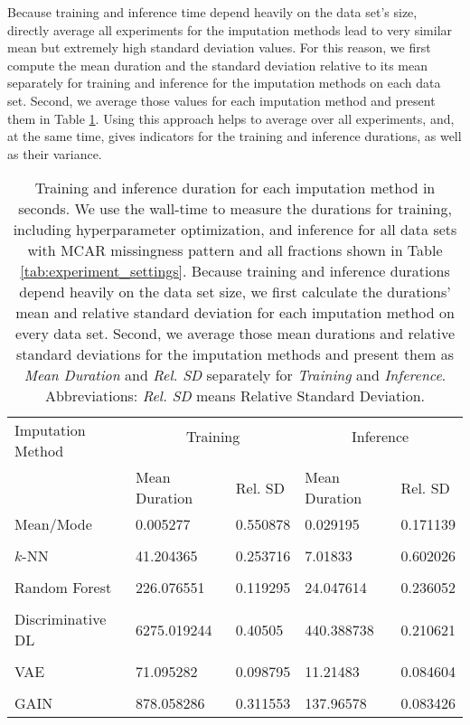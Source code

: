 Because training and inference time depend heavily on the data set's size, directly average all experiments for the imputation methods lead to very similar mean but extremely high standard deviation values. For this reason, we first compute the mean duration and the standard deviation relative to its mean separately for training and inference for the imputation methods on each data set. Second, we average those values for each imputation method and present them in Table \ref{tab:time}. Using this approach helps to average over all experiments, and, at the same time, gives indicators for the training and inference durations, as well as their variance.
%
\begin{table}
	\centering
	\begin{tabular}{@{\extracolsep{4pt}}lllll@{}}
		\toprule
		\multirow{2}{*}{Imputation Method} & \multicolumn{2}{c}{Training} & \multicolumn{2}{c}{Inference} \\\cline{2-3}\cline{4-5}
		\\[-0.75em]
		& Mean Duration &   Rel. SD & Mean Duration &   Rel. SD \\
		\midrule
		Mean/Mode &      0.005277 &  0.550878 &      0.029195 &  0.171139 \\
		\\[-0.5em]
		$k$-NN &     41.204365 &  0.253716 &       7.01833 &  0.602026 \\
		\\[-0.5em]
		Random Forest &    226.076551 &  0.119295 &     24.047614 &  0.236052 \\
		\\[-0.5em]
		Discriminative DL &   6275.019244 &   0.40505 &    440.388738 &  0.210621 \\
		\\[-0.5em]
		VAE &     71.095282 &  0.098795 &      11.21483 &  0.084604 \\
		\\[-0.5em]
		GAIN &    878.058286 &  0.311553 &     137.96578 &  0.083426 \\
		\bottomrule
	\end{tabular}
	\caption{Training and inference duration for each imputation method in seconds. We use the wall-time to measure the durations for training, including hyperparameter optimization, and inference for all data sets with MCAR missingness pattern and all fractions shown in Table \ref{tab:experiment_settings}. Because training and inference durations depend heavily on the data set size, we first calculate the durations' mean and relative standard deviation for each imputation method on every data set. Second, we average those mean durations and relative standard deviations for the imputation methods and present them as \emph{Mean Duration} and \emph{Rel. SD} separately for \emph{Training} and \emph{Inference}. Abbreviations: \emph{Rel. SD} means Relative Standard Deviation.}
	\label{tab:time}
\end{table}

